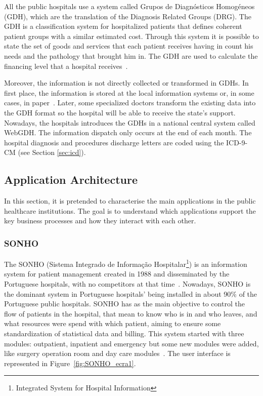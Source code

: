 All the public hospitals use a system called Grupos de Diagnósticos Homogéneos (GDH), which are the translation of the  Diagnosis Related Groups (DRG). The GDH is a classification system for hospitalized patients that defines coherent patient groups with a similar estimated cost. Through this system it is possible to state the set of goods and services that each patient receives having in count his needs and the pathology that brought him in. The GDH are used to calculate the financing level that a hospital receives~\citep{GDH2011}.

Moreover, the information is not directly collected or transformed in GDHs. In first place, the information is stored at the local information systems or, in some cases, in paper~\citep{Ferreira2008}. Later, some specialized doctors transform the existing data into the GDH format so the hospital will be able to receive the state's support. Nowadays, the hospitals introduces the GDHs in a national central system called WebGDH. The information dispatch only occurs at the end of each month. The hospital diagnosis and procedures discharge letters are coded using the ICD-9-CM (see Section \ref{sec:icd}).


\subsection{Application Architecture}

In this section, it is pretended to characterise the main applications in the public healthcare institutions. The goal is to understand which applications support the key business processes and how they interact with each other.


\subsubsection{SONHO}

The SONHO (Sistema Integrado de Informação Hospitalar\footnote{Integrated System for Hospital Information}) is an information system for patient management created in 1988 and disseminated by the Portuguese hospitals, with no competitors at that time~\citep{Teixeira2005}. Nowadays, SONHO is the dominant system in Portuguese hospitals' being installed in about 90\% of the Portuguese public hospitals. SONHO has as the main objective to control the flow of patients in the hospital, that mean to know who is in and who leaves, and what resources were spend with which patient, aiming to ensure some standardization of statistical data and billing. This system started with three modules: outpatient, inpatient and emergency but some new modules were added, like surgery operation room and day care modules~\citep{Cruz-correia}. The user interface is represented in Figure~\ref{fig:SONHO_ecra1}.


